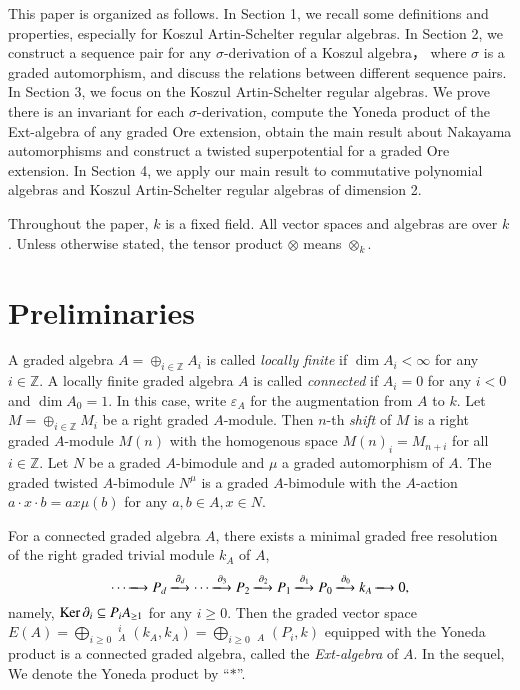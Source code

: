 \documentclass[a4paper,10pt]{amsart}
\theoremstyle{definition}
\numberwithin{equation}{section}
\DeclareMathOperator{\uExt}{\underline{Ext}}
\DeclareMathOperator{\uHom}{\underline{Hom}}
\begin{document}
This paper is organized as follows. In Section 1, we recall some definitions and properties, especially for Koszul Artin-Schelter regular algebras. In Section 2, we construct a sequence pair for any $\sigma$-derivation of a Koszul algebra， where $\sigma$ is a graded automorphism, and discuss the relations between different sequence pairs. In Section 3, we focus on the Koszul Artin-Schelter regular algebras. We prove there is an invariant for each $\sigma$-derivation, compute the Yoneda product of the Ext-algebra of any graded Ore extension, obtain the main result about Nakayama automorphisms and construct a twisted superpotential for a graded Ore extension. In Section 4, we apply our main result to commutative polynomial algebras and Koszul Artin-Schelter regular algebras of dimension 2.


Throughout the paper, $k$ is a fixed field. All vector spaces and algebras are over $k$. Unless otherwise stated, the tensor product $\otimes$ means $\otimes_k$.
\section{Preliminaries}\label{Section preliminaries}

A graded algebra $A=\oplus_{i\in\mathbb{Z}} A_i$ is called \emph{locally finite} if  $\dim A_i<\infty$ for any $i\in\mathbb{Z}$. A locally finite graded algebra $A$ is called \emph{connected} if $A_i=0$ for any $i<0$ and $\dim A_0=1$. In this case, write $\varepsilon_A$ for the augmentation from $A$ to $k$. Let $M=\oplus_{i\in \mathbb{Z}}M_i$ be a right graded $A$-module. Then $n$-th \emph{shift} of $M$ is a right graded $A$-module $M(n)$ with the homogenous space $M(n)_i=M_{n+i}$ for all $i\in\mathbb{Z}$. Let $N$ be a graded $A$-bimodule and $\mu$  a graded automorphism of $A$. The graded twisted  $A$-bimodule $N^{\mu}$ is a graded $A$-bimodule with the $A$-action $a\cdot x\cdot b=ax\mu(b)$ for any $a,b\in A,x\in N$.

For a connected graded algebra $A$, there exists a minimal graded free resolution of the right graded trivial module $k_A$ of $A$,
\begin{equation}\label{general Resolution of k_A}
\cdots\xlongrightarrow{} P_{d}\xlongrightarrow{\partial_d} \cdots\xlongrightarrow{\partial_3} P_{2}\xlongrightarrow{\partial_2} P_1\xlongrightarrow{\partial_1} P_0\xlongrightarrow{\partial_0} k_A\xlongrightarrow{} 0,
\end{equation}
namely, $\operatorname{Ker} \partial_i\subseteq P_{i}A_{\geq 1}$ for any $i\geq 0$. Then the graded vector space $E(A)=\bigoplus_{i\geq0}\uExt^i_A(k_A,k_A)=\bigoplus_{i\geq0}\uHom_A(P_i,k)$ equipped with the Yoneda product is a connected graded algebra, called the \emph{Ext-algebra} of $A$. In the sequel, We denote the Yoneda product by ``$\ast$''.
\end{document}
